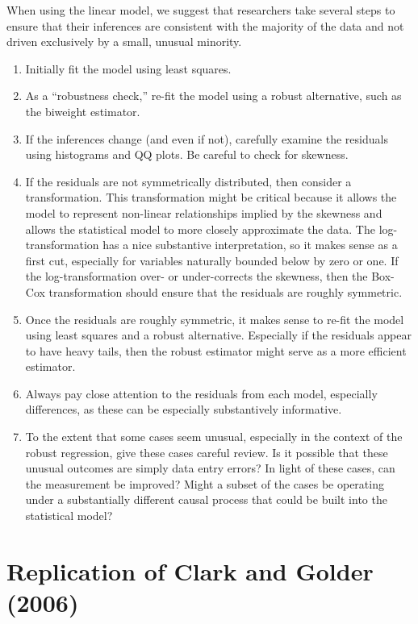 \documentclass[12pt]{article}
\begin{document}
When using the linear model, we suggest that researchers take several steps to ensure that their inferences are consistent with the majority of the data and not driven exclusively by a small, unusual minority. 
\begin{enumerate}
	\item Initially fit the model using least squares. 
	\item As a ``robustness check,'' re-fit the model using a robust alternative, such as the biweight estimator. 
	\item If the inferences change (and even if not), carefully examine the residuals using histograms and QQ plots. Be careful to check for skewness.
	\item If the residuals are not symmetrically distributed, then consider a transformation. This transformation might be critical because it allows the model to represent non-linear relationships implied by the skewness and allows the statistical model to more closely approximate the data. The log-transformation has a nice substantive interpretation, so it makes sense as a first cut, especially for variables naturally bounded below by zero or one. If the log-transformation over- or under-corrects the skewness, then the Box-Cox transformation should ensure that the residuals are roughly symmetric.
	\item Once the residuals are roughly symmetric, it makes sense to re-fit the model using least squares and a robust alternative. Especially if the residuals appear to have heavy tails, then the robust estimator might serve as a more efficient estimator.
	\item Always pay close attention to the residuals from each model, especially differences, as these can be especially substantively informative.
	\item To the extent that some cases seem unusual, especially in the context of the robust regression, give these cases careful review. Is it possible that these unusual outcomes are simply data entry errors? In light of these cases, can the measurement be improved? Might a subset of the cases be operating under a substantially different causal process that could be built into the statistical model? 
\end{enumerate}

\section*{Replication of Clark and Golder (2006)}
\end{document}
